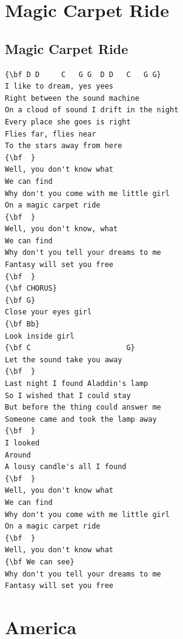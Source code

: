 \documentclass[a4paper]{article}
\begin{document}
\section{Magic Carpet Ride}
\subsection{Magic Carpet Ride}
\begin{multicols}{2}\begin{Verbatim}[commandchars=\\\{\}]
{\bf D D     C   G G  D D   C   G G}
I like to dream, yes yees
Right between the sound machine
On a cloud of sound I drift in the night
Every place she goes is right
Flies far, flies near
To the stars away from here
{\bf  }
Well, you don't know what
We can find
Why don't you come with me little girl
On a magic carpet ride
{\bf  }
Well, you don't know, what
We can find
Why don't you tell your dreams to me
Fantasy will set you free
{\bf  }
{\bf CHORUS}
{\bf G}
Close your eyes girl
{\bf Bb}
Look inside girl
{\bf C                      G}
Let the sound take you away
{\bf  }
Last night I found Aladdin's lamp
So I wished that I could stay
But before the thing could answer me
Someone came and took the lamp away
{\bf  }
I looked
Around
A lousy candle's all I found
{\bf  }
Well, you don't know what
We can find
Why don't you come with me little girl
On a magic carpet ride
{\bf  }
Well, you don't know what
{\bf We can see}
Why don't you tell your dreams to me
Fantasy will set you free

\end{Verbatim}
\end{multicols}\newpage
\section{America}
\end{document}
